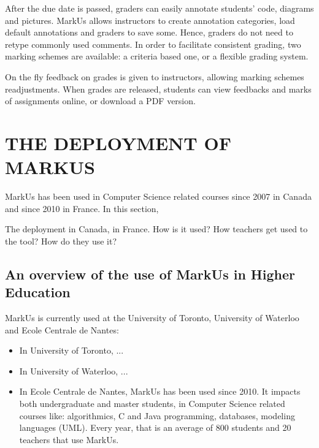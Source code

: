 \documentclass[twocolumn,10pt]{asme2e}
\begin{document}
After the due date is passed, graders can easily annotate students' code,
diagrams and pictures. MarkUs allows instructors to create annotation
categories, load default annotations and graders to save some. Hence, graders
do not need to retype commonly used comments. In order to facilitate
consistent grading, two marking schemes are available: a criteria based one,
or a flexible grading system.

On the fly feedback on grades is given to instructors, allowing marking
schemes readjustments. When grades are released, students can view feedbacks
and marks of assignments online, or download a PDF version.



\section*{THE DEPLOYMENT OF MARKUS}

MarkUs has been used in Computer Science related courses since 2007 in Canada and since 2010 in France. In this section, 

The deployment in Canada, in France. How is it used? How teachers get used to the tool? How do they use it?

\subsection*{An overview of the use of MarkUs in Higher Education}

MarkUs is currently used at the University of Toronto, University of Waterloo and Ecole Centrale de Nantes: 
\begin{itemize}
\item In University of Toronto, ... %
\item In University of Waterloo, ... %
\item In Ecole Centrale de Nantes, MarkUs has been used since 2010. It impacts both undergraduate and master students, in Computer Science related courses like: algorithmics, C and Java programming, databases, modeling languages (UML). Every year, that is an average of 800 students and 20 teachers that use MarkUs. %
\end{itemize}
\end{document}
